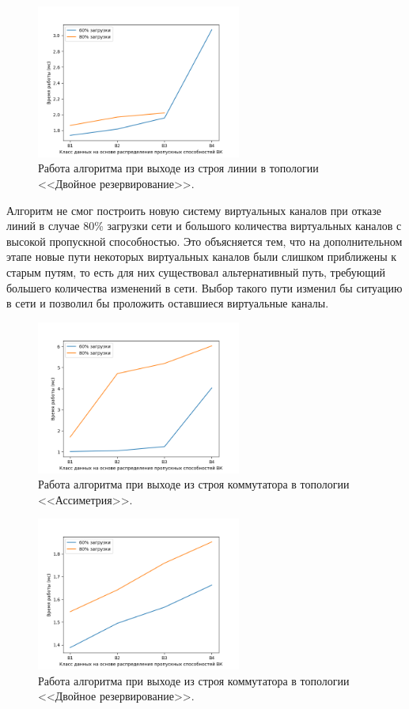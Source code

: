 \documentclass[12pt, a4paper]{article}
\begin{document}
\begin{figure}[h!]
	\centering
	\includegraphics[width=0.60\textwidth]{img/double_res.png}
	\caption{Работа алгоритма при выходе из строя линии в топологии <<Двойное резервирование>>.}
	\label{pic:double_res}
\end{figure}


Алгоритм не смог построить новую систему виртуальных каналов при отказе линий в случае 80\% загрузки сети и большого количества виртуальных каналов с высокой пропускной способностью. Это объясняется тем, что на дополнительном этапе новые пути некоторых виртуальных каналов были слишком приближены к старым путям, то есть для них существовал альтернативный путь, требующий большего количества изменений в сети. Выбор такого пути изменил бы ситуацию в сети и позволил бы проложить оставшиеся виртуальные каналы.

\begin{figure}[h!]
	\centering
	\includegraphics[width=0.60\textwidth]{img/5node_res_sw.png}
	\caption{Работа алгоритма при выходе из строя коммутатора в топологии <<Ассиметрия>>.}
	\label{pic:5node_res_sw}
\end{figure}

\begin{figure}[h!]
	\centering
	\includegraphics[width=0.60\textwidth]{img/double_res_sw.png}
	\caption{Работа алгоритма при выходе из строя коммутатора в топологии <<Двойное резервирование>>.}
	\label{pic:double_res_sw}
\end{figure}
\end{document}
